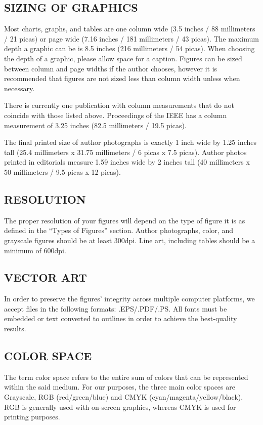 \documentclass{IEEEoj}
\begin{document}
\subsection{SIZING OF GRAPHICS}
Most charts, graphs, and tables are one column wide (3.5 inches / 88 
millimeters / 21 picas) or page wide (7.16 inches / 181 millimeters / 43 
picas). The maximum depth a graphic can be is 8.5 inches (216 millimeters / 
54 picas). When choosing the depth of a graphic, please allow space for a 
caption. Figures can be sized between column and page widths if the author 
chooses, however it is recommended that figures are not sized less than 
column width unless when necessary.

There is currently one publication with column measurements that do not 
coincide with those listed above. Proceedings of the IEEE has a column 
measurement of 3.25 inches (82.5 millimeters / 19.5 picas). 

The final printed size of author photographs is exactly 
1 inch wide by 1.25 inches tall (25.4 millimeters x 31.75 millimeters / 6 
picas x 7.5 picas). Author photos printed in editorials measure 1.59 inches 
wide by 2 inches tall (40 millimeters x 50 millimeters / 9.5 picas x 12 
picas).

\subsection{RESOLUTION}
The proper resolution of your figures will depend on the type of figure it 
is as defined in the ``Types of Figures'' section. Author photographs, 
color, and grayscale figures should be at least 300dpi. Line art, including 
tables should be a minimum of 600dpi.

\subsection{VECTOR ART}
In order to preserve the figures' integrity across multiple computer 
platforms, we accept files in the following formats: .EPS/.PDF/.PS. All 
fonts must be embedded or text converted to outlines in order to achieve the 
best-quality results.

\subsection{COLOR SPACE}
The term color space refers to the entire sum of colors that can be 
represented within the said medium. For our purposes, the three main color 
spaces are Grayscale, RGB (red/green/blue) and CMYK 
(cyan/magenta/yellow/black). RGB is generally used with on-screen graphics, 
whereas CMYK is used for printing purposes.
\end{document}
